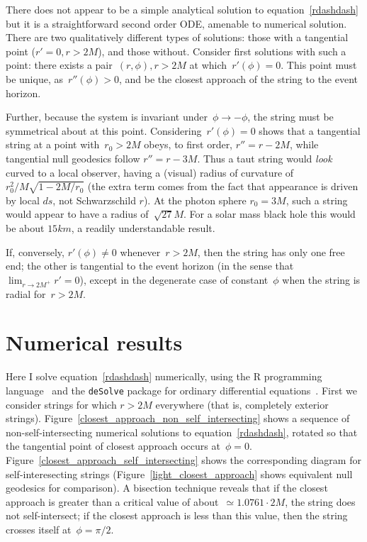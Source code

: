 \documentclass[review]{elsarticle}
\begin{document}
There does not appear to be a simple analytical solution to
equation~\ref{rdashdash} but it is a straightforward second order ODE,
amenable to numerical solution.  There are two qualitatively different
types of solutions: those with a tangential point ($r'=0,r>2M$), and
those without.  Consider first solutions with such a point: there
exists a pair~$\left(r,\phi\right), r>2M$ at which~$r'(\phi)=0$.  This
point must be unique, as~$r''(\phi)>0$, and be the closest approach of
the string to the event horizon.

Further, because the system is invariant
under~$\phi\longrightarrow-\phi$, the string must be symmetrical about
at this point.  Considering~$r'(\phi)=0$ shows that a tangential
string at a point with~$r_0>2M$ obeys, to first order, $r''=r-2M$,
while tangential null geodesics follow $r''=r-3M$.  Thus a taut string
would {\em look} curved to a local observer, having a (visual) radius
of curvature of $r_0^2/M\sqrt{1-2M/r_0}$ (the extra term comes from
the fact that appearance is driven by local $ds$, not Schwarzschild
$r$).  At the photon sphere $r_0=3M$, such a string would appear to
have a radius of~$\sqrt{27}M$.  For a solar mass black hole this would
be about $15\unit{km}$, a readily understandable result.

If, conversely, $r'(\phi)\neq 0$ whenever~$r>2M$, then the string has
only one free end; the other is tangential to the event horizon (in
the sense that ${\displaystyle \lim_{r\longrightarrow 2M^+}r'=0}$),
except in the degenerate case of constant~$\phi$ when the string is
radial for~$r>2M$.

\section{Numerical results}

Here I solve equation~\ref{rdashdash} numerically, using the R
programming language~\cite{rcore2019} and the \verb+deSolve+ package
for ordinary differential equations~\cite{soetart2010}.  First we
consider strings for which $r>2M$ everywhere (that is, completely
exterior strings).
Figure~\ref{closest_approach_non_self_intersecting} shows a sequence
of non-self-intersecting numerical solutions to
equation~\ref{rdashdash}, rotated so that the tangential point of
closest approach occurs at~$\phi=0$.
Figure~\ref{closest_approach_self_intersecting} shows the
corresponding diagram for self-interesecting strings
(Figure~\ref{light_closest_approach} shows equivalent null geodesics
for comparison).  A bisection technique reveals that if the closest
approach is greater than a critical value of about~$\simeq 1.0761\cdot
2M$, the string does not self-intersect; if the closest approach is
less than this value, then the string crosses itself at~$\phi=\pi/2$.
\end{document}
